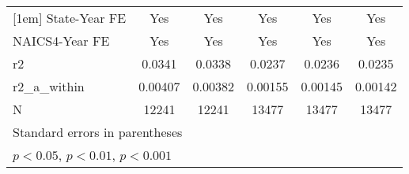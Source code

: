 {\begin{tabular}{l*{5}{c}}
[1em]
State-Year FE&         Yes         &         Yes         &         Yes         &         Yes         &         Yes         \\
[1em]
NAICS4-Year FE&         Yes         &         Yes         &         Yes         &         Yes         &         Yes         \\
\hline
r2          &      0.0341         &      0.0338         &      0.0237         &      0.0236         &      0.0235         \\
r2\_a\_within &     0.00407         &     0.00382         &     0.00155         &     0.00145         &     0.00142         \\
N           &       12241         &       12241         &       13477         &       13477         &       13477         \\
\hline\hline
\multicolumn{6}{l}{\footnotesize Standard errors in parentheses}\\
\multicolumn{6}{l}{\footnotesize \sym{*} \(p<0.05\), \sym{**} \(p<0.01\), \sym{***} \(p<0.001\)}\\
\end{tabular}
}
